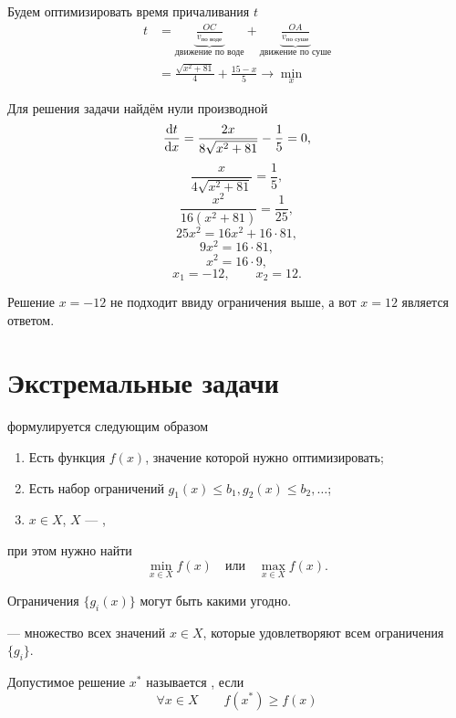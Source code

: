 \bigskip

\solution

Будем оптимизировать время причаливания $t$
\begin{align*}
	t &= \underbrace{\frac{OC}{v_{\text{по воде}}}}_{\text{движение по воде}} + \underbrace{\frac{OA}{v_{\text{по суше}}}}_{\text{движение по суше}} \\
	&= \boxed{\frac{\sqrt{x^2+81}}{4} + \frac{15 - x}{5} \to \min_x}
\end{align*}

Для решения задачи найдём нули производной
\[\derivative{t}{x} = \frac{2x}{8\sqrt{x^2+81}} - \frac{1}{5} = 0,\]
\[\frac{x}{4\sqrt{x^2+81}} = \frac{1}{5},\]
\[\frac{x^2}{16(x^2 + 81)} = \frac{1}{25},\]
\[25x^2 = 16x^2 + 16 \cdot 81,\]
\[9x^2 = 16 \cdot 81,\]
\[x^2 = 16 \cdot 9,\]
\[x_1 = -12, \qquad x_2 = 12.\]

Решение $x = -12$ не подходит ввиду ограничения выше, а вот $\boxed{x = 12}$ является ответом.

\section{Экстремальные задачи}


 формулируется следующим образом

\begin{enumerate}[nosep]
	\item Есть функция $f(x)$, значение которой нужно оптимизировать;
	
	\item Есть набор ограничений $g_1(x) \le b_1, g_2(x) \le b_2, \dots$;
	
	\item $x \in X$, $X$ --- ,
\end{enumerate}

при этом нужно найти
\[\min_{x \in X} f(x) \quad \text{или} \quad \max_{x \in X} f(x).\]

\remark

Ограничения $\{g_i(x)\}$ могут быть какими угодно.


 --- множество всех значений $x \in X$, которые удовлетворяют всем ограничения $\{g_i\}$.


Допустимое решение $x^*$ называется , если
\[\forall x \in X \qquad f(x^*) \ge f(x)\]

